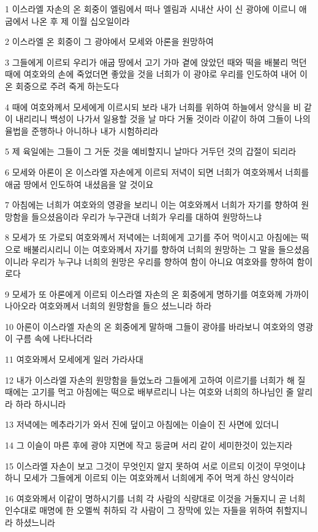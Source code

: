 \par 1 이스라엘 자손의 온 회중이 엘림에서 떠나 엘림과 시내산 사이 신 광야에 이르니 애굽에서 나온 후 제 이월 십오일이라
\par 2 이스라엘 온 회중이 그 광야에서 모세와 아론을 원망하여
\par 3 그들에게 이르되 우리가 애굽 땅에서 고기 가마 곁에 앉았던 때와 떡을 배불리 먹던 때에 여호와의 손에 죽었더면 좋았을 것을 너희가 이 광야로 우리를 인도하여 내어 이 온 회중으로 주려 죽게 하는도다
\par 4 때에 여호와께서 모세에게 이르시되 보라 내가 너희를 위하여 하늘에서 양식을 비 같이 내리리니 백성이 나가서 일용할 것을 날 마다 거둘 것이라 이같이 하여 그들이 나의 율법을 준행하나 아니하나 내가 시험하리라
\par 5 제 육일에는 그들이 그 거둔 것을 예비할지니 날마다 거두던 것의 갑절이 되리라
\par 6 모세와 아론이 온 이스라엘 자손에게 이르되 저녁이 되면 너희가 여호와께서 너희를 애굽 땅에서 인도하여 내셨음을 알 것이요
\par 7 아침에는 너희가 여호와의 영광을 보리니 이는 여호와께서 너희가 자기를 향하여 원망함을 들으셨음이라 우리가 누구관대 너희가 우리를 대하여 원망하느냐
\par 8 모세가 또 가로되 여호와께서 저녁에는 너희에게 고기를 주어 먹이시고 아침에는 떡으로 배불리시리니 이는 여호와께서 자기를 향하여 너희의 원망하는 그 말을 들으셨음이니라 우리가 누구냐 너희의 원망은 우리를 향하여 함이 아니요 여호와를 향하여 함이로다
\par 9 모세가 또 아론에게 이르되 이스라엘 자손의 온 회중에게 명하기를 여호와께 가까이 나아오라 여호와께서 너희의 원망함을 들으 셨느니라 하라
\par 10 아론이 이스라엘 자손의 온 회중에게 말하매 그들이 광야를 바라보니 여호와의 영광이 구름 속에 나타나더라
\par 11 여호와께서 모세에게 일러 가라사대
\par 12 내가 이스라엘 자손의 원망함을 들었노라 그들에게 고하여 이르기를 너희가 해 질 때에는 고기를 먹고 아침에는 떡으로 배부르리니 나는 여호와 너희의 하나님인 줄 알리라 하라 하시니라
\par 13 저녁에는 메추라기가 와서 진에 덮이고 아침에는 이슬이 진 사면에 있더니
\par 14 그 이슬이 마른 후에 광야 지면에 작고 둥글며 서리 같이 세미한것이 있는지라
\par 15 이스라엘 자손이 보고 그것이 무엇인지 알지 못하여 서로 이르되 이것이 무엇이냐 하니 모세가 그들에게 이르되 이는 여호와께서 너희에게 주어 먹게 하신 양식이라
\par 16 여호와께서 이같이 명하시기를 너희 각 사람의 식량대로 이것을 거둘지니 곧 너희 인수대로 매명에 한 오멜씩 취하되 각 사람이 그 장막에 있는 자들을 위하여 취할지니라 하셨느니라
